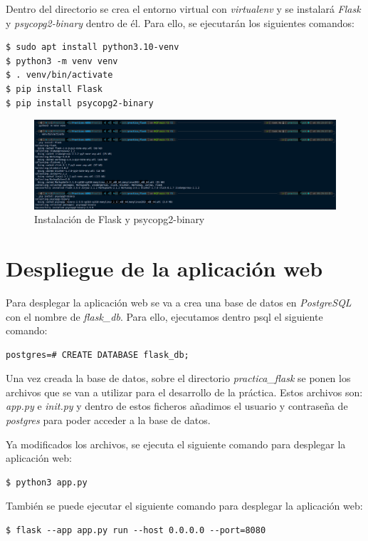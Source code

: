 \documentclass[11pt]{report}
\begin{document}
Dentro del directorio se crea el entorno virtual con \emph{virtualenv} y se instalará \emph{Flask} y
\emph{psycopg2-binary} dentro de él. Para ello, se ejecutarán los siguientes comandos:
\begin{verbatim}
$ sudo apt install python3.10-venv
$ python3 -m venv venv
$ . venv/bin/activate
$ pip install Flask
$ pip install psycopg2-binary
\end{verbatim}
\begin{figure}[H]
  \centering
  \includegraphics[scale=0.27]{img/instalation.png}
  \caption{Instalación de Flask y psycopg2-binary}
  \label{fig:instalacion_flask}
\end{figure}

\cleardoublepage
\section{Despliegue de la aplicación web}
Para desplegar la aplicación web se va a crea una base de datos en \emph{PostgreSQL} con el nombre
de \emph{flask\_db}. Para ello, ejecutamos dentro psql el siguiente comando:
\begin{verbatim}
postgres=# CREATE DATABASE flask_db;
\end{verbatim}

Una vez creada la base de datos, sobre el directorio \emph{practica\_flask} se ponen los archivos que se van
a utilizar para el desarrollo de la práctica. Estos archivos son: \emph{app.py} e \emph{init.py} y dentro de
estos ficheros añadimos el usuario y contraseña de \emph{postgres} para poder acceder a la base de datos.

Ya modificados los archivos, se ejecuta el siguiente comando para desplegar la aplicación web:
\begin{verbatim}
$ python3 app.py
\end{verbatim}

Tambi\'en se puede ejecutar el siguiente comando para desplegar la aplicación web:
\begin{verbatim}
$ flask --app app.py run --host 0.0.0.0 --port=8080
\end{verbatim}
\end{document}
